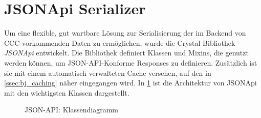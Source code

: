 \section{JSONApi Serializer}
\label{sec:b_jsonapi_serializer}

Um eine flexible, gut wartbare Lösung zur Serialisierung der im Backend von CCC
vorkommenden Daten zu ermöglichen, wurde die Crystal-Bibliothek \emph{JSONApi}
entwickelt.  Die Bibliothek definiert Klassen und Mixins, die genutzt werden
können, um JSON-API-Konforme Responses zu definieren.  Zusätzlich ist sie mit
einem automatisch verwalteten Cache versehen, auf den in \cref{ssec:bj_caching}
näher eingegangen wird.  In \cref{fig:json_api_klassendiagramm} ist die
Architektur von JSONApi mit den wichtigsten Klassen dargestellt.

\begin{figure}
	\center
	
	\caption{JSON-API: Klassendiagramm}
	\label{fig:json_api_klassendiagramm}
\end{figure}





